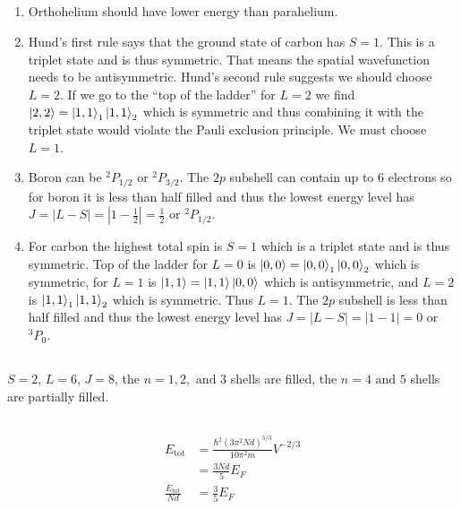 \documentclass{article}
\begin{document}
\subsection{}

\begin{enumerate}
  \item Orthohelium should have lower energy than parahelium.

  \item Hund's first rule says that the ground state of carbon has $S = 1$. This is a triplet state and is thus symmetric. That means the spatial wavefunction needs to be antisymmetric. Hund's second rule suggests we should choose $L = 2$. If we go to the ``top of the ladder'' for $L = 2$ we find $\ket{2, 2} = \ket{1, 1}_1 \ket{1, 1}_2$ which is symmetric and thus combining it with the triplet state would violate the Pauli exclusion principle. We must choose $L = 1$.

  \item Boron can be $^2 P_{1 / 2}$ or $^2 P_{3 / 2}$. The $2 p$ subshell can contain up to 6 electrons so for boron it is less than half filled and thus the lowest energy level has $J = |L - S| = |1 - \frac{1}{2}| = \frac{1}{2}$ or $^2 P_{1 / 2}$.

  \item For carbon the highest total spin is $S = 1$ which is a triplet state and is thus symmetric. Top of the ladder for $L = 0$ is $\ket{0, 0} = \ket{0, 0}_1 \ket{0, 0}_2$ which is symmetric, for $L = 1$ is $\ket{1, 1} = \ket{1, 1} \ket{0, 0}$ which is antisymmetric, and $L = 2$ is $\ket{1, 1}_1 \ket{1, 1}_2$ which is symmetric. Thus $L = 1$. The $2 p$ subshell is less than half filled and thus the lowest energy level has $J = |L - S| = |1 - 1| = 0$ or $^3 P_0$.
\end{enumerate}

\subsection{}

$S = 2$, $L = 6$, $J = 8$, the $n = 1, 2, \text{ and } 3$ shells are filled, the $n = 4 \text{ and } 5$ shells are partially filled.

\subsection{}

\begin{align*}
  E_\text{tot}             & = \frac{\hbar^2 (3 \pi^2 N d)^{5 / 3}}{10 \pi^2 m} V^{-2 / 3} \\
                           & = \frac{3 N d}{5} E_F                                         \\
  \frac{E_\text{tot}}{N d} & = \frac{3}{5} E_F
\end{align*}
\end{document}

